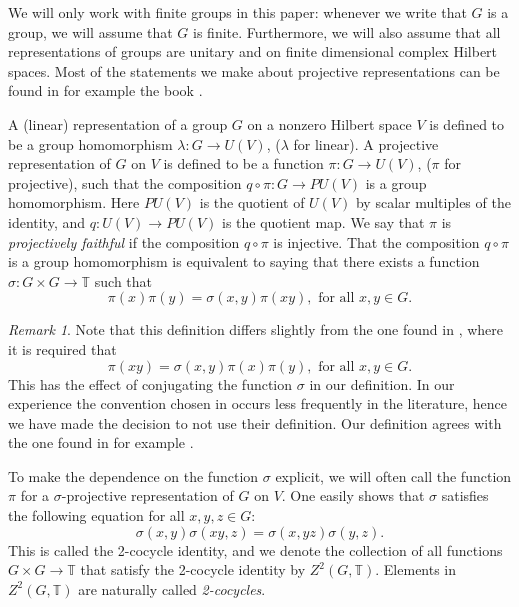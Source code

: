\documentclass[11pt, oneside, reqno]{amsart}
\newcommand{\bbT}{\mathbb{T}}
\theoremstyle{definition}
\theoremstyle{plain}
\theoremstyle{remark}
\newtheorem{remark}[definition]{Remark}
\begin{document}
We will only work with finite groups in this paper: whenever we write that $G$ is a group, we will assume that $G$ is finite. Furthermore, we will also assume that all representations of groups are unitary and on finite dimensional complex Hilbert spaces. Most of the statements we make about projective representations can be found in for example the book \cite[Chapters 7-9]{CeccheriniSilbersteinTullio22}.

A (linear) representation of a group $G$ on a nonzero Hilbert space $V$ is defined to be a group homomorphism $\lambda \colon G \to U(V)$, ($\lambda$ for linear). A projective representation of $G$ on $V$ is defined to be a function $\pi \colon G \to U(V)$, ($\pi$ for projective), such that the composition $q \circ \pi \colon G \to PU(V)$ is a group homomorphism. Here $PU(V)$ is the quotient of $U(V)$ by scalar multiples of the identity, and $q \colon U(V) \to PU(V)$ is the quotient map. We say that $\pi$ is \emph{projectively faithful} if the composition $q \circ \pi$ is injective. That the composition $q \circ \pi$ is a group homomorphism is equivalent to saying that there exists a function $\sigma \colon G \times G \to \bbT$ such that
\begin{equation*}
    \pi(x)\pi(y) = \sigma(x,y)\pi(xy), \text{ for all } x,y \in G.
\end{equation*}

\begin{remark}
    Note that this definition differs slightly from the one found in \cite{CeccheriniSilbersteinTullio22}, where it is required that
    \begin{equation*}
        \pi(xy) = \sigma(x,y)\pi(x)\pi(y), \text{ for all } x,y \in G.
    \end{equation*}
    This has the effect of conjugating the function $\sigma$ in our definition. In our experience the convention chosen in \cite{CeccheriniSilbersteinTullio22} occurs less frequently in the literature, hence we have made the decision to not use their definition. Our definition agrees with the one found in for example \cite{Cheng15}.
\end{remark}

To make the dependence on the function $\sigma$ explicit, we will often call the function $\pi$ for a $\sigma$-projective representation of $G$ on $V$. One easily shows that $\sigma$ satisfies the following equation for all $x,y,z \in G$:
\begin{equation*}
    \sigma(x,y)\sigma(xy,z) = \sigma(x,yz)\sigma(y,z).
\end{equation*}
This is called the 2-cocycle identity, and we denote the collection of all functions $G \times G \to \bbT$ that satisfy the 2-cocycle identity by $Z^2(G,\bbT)$. Elements in $Z^2(G,\bbT)$ are naturally called \emph{2-cocycles}.
\end{document}
